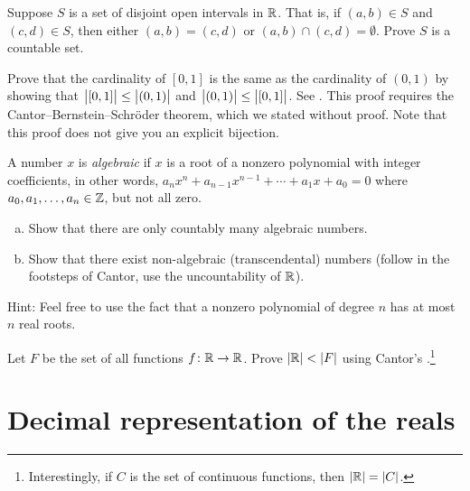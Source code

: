 \begin{exercise}
Suppose $S$ is a set of disjoint open intervals in ${\mathbb{R}}$.  That is,
if $(a,b) \in S$ and $(c,d) \in S$, then either $(a,b) = (c,d)$
or $(a,b) \cap (c,d) = \emptyset$.  Prove $S$ is a countable set.
\end{exercise}

\begin{exercise}
Prove that the cardinality of $[0,1]$ is the same as the cardinality of
$(0,1)$ by showing that
$\bigl\lvert {[0,1]} \bigr\rvert \leq \bigl\lvert {(0,1)} \bigr\rvert$ and
$\bigl\lvert {(0,1)} \bigr\rvert \leq \bigl\lvert {[0,1]} \bigr\rvert$.
See .
This proof requires the Cantor--Bernstein--Schr\"oder theorem, which we
stated without proof.  Note that this proof does not give you an
explicit bijection.
\end{exercise}

\begin{exercise}[Challenging]
A number $x$ is \emph{algebraic} if $x$ is a root of
a nonzero polynomial with
integer coefficients, in other words, $a_n x^n + a_{n-1} x^{n-1} + \cdots
+ a_1 x + a_0 = 0$ where $a_0,a_1,\ldots,a_n \in {\mathbb{Z}}$, but not all zero.
\begin{enumerate}[a)]
\item
Show that there are only
countably many algebraic numbers.
\item
Show that there exist non-algebraic (transcendental)
numbers (follow in the footsteps of Cantor, use the uncountability of ${\mathbb{R}}$).
\end{enumerate}
Hint: Feel free to use the fact that a nonzero polynomial of degree $n$ has at most $n$ real
roots.
\end{exercise}

\begin{exercise}[Challenging]
Let $F$ be the set of all functions $f \colon {\mathbb{R}} \to {\mathbb{R}}$.
Prove $\lvert {{\mathbb{R}}} \rvert < \lvert {F} \rvert$
using Cantor's .\footnote{Interestingly,
if $C$ is the set of continuous functions, then $\lvert {{\mathbb{R}}} \rvert = \lvert {C} \rvert$.}
\end{exercise}


\sectionnewpage
\section{Decimal representation of the reals}
\label{sec:decimals}


